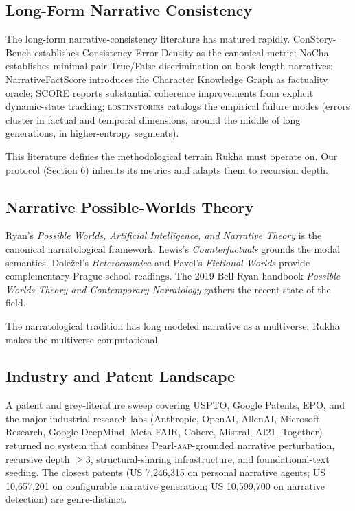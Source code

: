 \documentclass[11pt]{article}
\theoremstyle{rukha}
\begin{document}
\subsection{Long-Form Narrative Consistency}

The long-form narrative-consistency literature has matured rapidly.
ConStory-Bench \cite{constory} establishes Consistency Error Density as
the canonical metric; NoCha \cite{nocha} establishes minimal-pair
True/False discrimination on book-length narratives;
NarrativeFactScore \cite{narrativefactscore} introduces the Character
Knowledge Graph as factuality oracle; SCORE \cite{scorestory} reports
substantial coherence improvements from explicit dynamic-state tracking;
\textsc{lostinstories} \cite{lostinstories} catalogs the empirical
failure modes (errors cluster in factual and temporal dimensions, around
the middle of long generations, in higher-entropy segments).

This literature defines the methodological terrain Rukha must operate
on. Our protocol (Section 6) inherits its metrics and adapts them to
recursion depth.

\subsection{Narrative Possible-Worlds Theory}

Ryan's \emph{Possible Worlds, Artificial Intelligence, and Narrative
Theory} \cite{ryan} is the canonical narratological framework. Lewis's
\emph{Counterfactuals} \cite{lewiscounterfactuals} grounds the modal
semantics. Doležel's \emph{Heterocosmica} and Pavel's \emph{Fictional
Worlds} provide complementary Prague-school readings. The 2019 Bell-Ryan
handbook \emph{Possible Worlds Theory and Contemporary Narratology}
gathers the recent state of the field.

The narratological tradition has long modeled narrative as a multiverse;
Rukha makes the multiverse computational.

\subsection{Industry and Patent Landscape}

A patent and grey-literature sweep covering USPTO, Google Patents, EPO,
and the major industrial research labs (Anthropic, OpenAI, AllenAI,
Microsoft Research, Google DeepMind, Meta FAIR, Cohere, Mistral, AI21,
Together) returned no system that combines Pearl-\textsc{aap}-grounded
narrative perturbation, recursive depth $\geq 3$, structural-sharing
infrastructure, and foundational-text seeding. The closest patents
(US 7{,}246{,}315 on personal narrative agents; US 10{,}657{,}201 on
configurable narrative generation; US 10{,}599{,}700 on narrative
detection) are genre-distinct.
\end{document}
